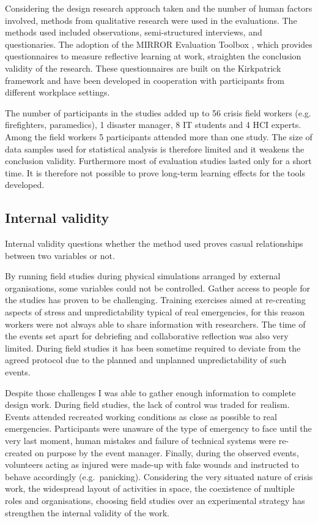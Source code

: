Considering the design research approach taken and the number of human factors involved, methods from qualitative research were used in the evaluations. The methods used included observations, semi-structured interviews, and questionaries. The adoption of the MIRROR Evaluation Toolbox \autocite{Renner:v4nLmwOk}, which provides questionnaires to measure reflective learning at work, straighten the conclusion validity of the research. These questionnaires are built on the Kirkpatrick framework \autocite{kirkpatrick2009evaluating} and have been developed in cooperation with participants from different workplace settings.

The number of participants in the studies added up to 56 crisis field workers (e.g. firefighters, paramedics), 1 disaster manager, 8 IT students and 4 HCI experts. Among the field workers 5 participants attended more than one study. The size of data samples used for statistical analysis is therefore limited and it weakens the conclusion validity. Furthermore most of evaluation studies lasted only for a short time. It is therefore not possible to prove long-term learning effects for the tools developed.

\subsection{Internal validity}\label{internal-validity}

Internal validity questions whether the method used proves casual relationships between two variables or not.

By running field studies during physical simulations arranged by external organisations, some variables could not be controlled. Gather access to people for the studies has proven to be challenging. Training exercises aimed at re-creating aspects of stress and unpredictability typical of real emergencies, for this reason workers were not always able to share information with researchers. The time of the events set apart for debriefing and collaborative reflection was also very limited. During field studies it has been sometime required to deviate from the agreed protocol due to the planned and unplanned unpredictability of such events.

Despite those challenges I was able to gather enough information to complete  design work. During field studies, the lack of control was traded for realism. Events attended recreated working conditions as close as possible to real emergencies. Participants were unaware of the type of emergency to face until the very last moment, human mistakes and failure of technical systems were re-created on purpose by the event manager. Finally, during the observed events, volunteers acting as injured were made-up with fake wounds and instructed to behave accordingly (e.g.~panicking). Considering the very situated nature of crisis work, the widespread layout of activities in space, the coexistence of multiple roles and organisations, choosing field studies over an experimental strategy has strengthen the internal validity of the work. 

